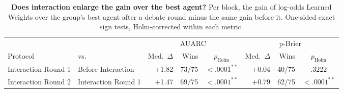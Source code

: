 \begin{table}[t]
\centering
\small
\setlength{\tabcolsep}{3.5pt}
\begin{tabular}{ll rrc rrc}
\toprule
 & & \multicolumn{3}{c}{AUARC} & \multicolumn{3}{c}{p-Brier} \\
\cmidrule(lr){3-5} \cmidrule(lr){6-8}
Protocol & vs. & Med.\ $\Delta$ & Wins & $p_{\mathrm{Holm}}$ & Med.\ $\Delta$ & Wins & $p_{\mathrm{Holm}}$ \\
\midrule
Interaction Round 1 & Before Interaction & +1.82 & 73/75 & $<.0001^{**}$ & +0.04 & 40/75 & $.3222$ \\
\midrule
Interaction Round 2 & Interaction Round 1 & +1.47 & 69/75 & $<.0001^{**}$ & +0.79 & 62/75 & $<.0001^{**}$ \\
\bottomrule
\end{tabular}
\caption{\textbf{Does interaction enlarge the gain over the best agent?} Per block, the gain of log-odds Learned Weights over the group's best agent after a debate round minus the same gain before it. One-sided exact sign tests, Holm-corrected within each metric.}
\label{tab:significance_interaction}
\end{table}

